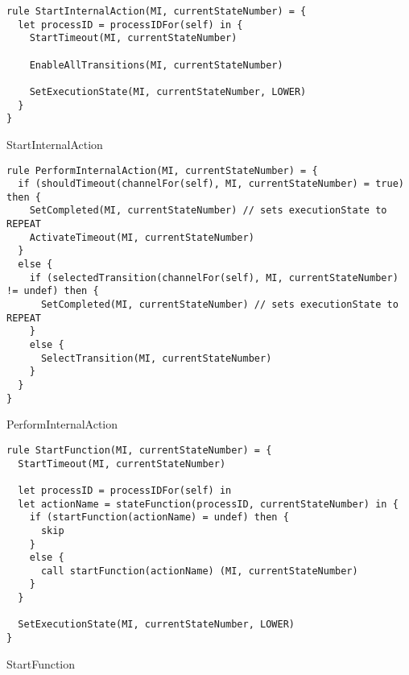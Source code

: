 \begin{listing}[H]
\begin{verbatim}
rule StartInternalAction(MI, currentStateNumber) = {
  let processID = processIDFor(self) in {
    StartTimeout(MI, currentStateNumber)

    EnableAllTransitions(MI, currentStateNumber)

    SetExecutionState(MI, currentStateNumber, LOWER)
  }
}
\end{verbatim}
\caption{StartInternalAction}
\label{lst:asm:StartInternalAction}
\end{listing}




\begin{listing}[H]
\begin{verbatim}
rule PerformInternalAction(MI, currentStateNumber) = {
  if (shouldTimeout(channelFor(self), MI, currentStateNumber) = true) then {
    SetCompleted(MI, currentStateNumber) // sets executionState to REPEAT
    ActivateTimeout(MI, currentStateNumber)
  }
  else {
    if (selectedTransition(channelFor(self), MI, currentStateNumber) != undef) then {
      SetCompleted(MI, currentStateNumber) // sets executionState to REPEAT
    }
    else {
      SelectTransition(MI, currentStateNumber)
    }
  }
}
\end{verbatim}
\caption{PerformInternalAction}
\label{lst:asm:PerformInternalAction}
\end{listing}






\begin{listing}[H]
\begin{verbatim}
rule StartFunction(MI, currentStateNumber) = {
  StartTimeout(MI, currentStateNumber)

  let processID = processIDFor(self) in
  let actionName = stateFunction(processID, currentStateNumber) in {
    if (startFunction(actionName) = undef) then {
      skip
    }
    else {
      call startFunction(actionName) (MI, currentStateNumber)
    }
  }

  SetExecutionState(MI, currentStateNumber, LOWER)
}
\end{verbatim}
\caption{StartFunction}
\label{lst:asm:StartFunction}
\end{listing}




